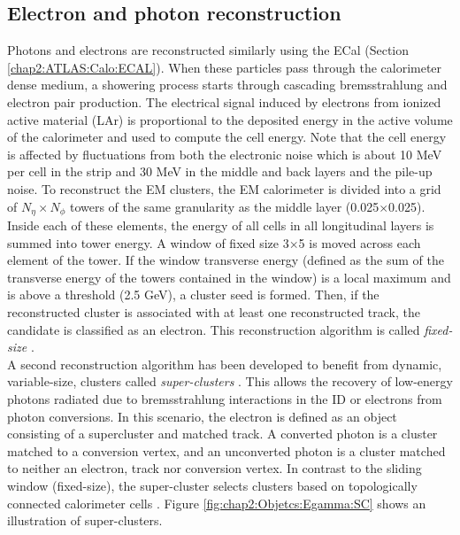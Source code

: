 \subsection{Electron and photon reconstruction}
\label{chap2:Objects:Egamma}
Photons and electrons are reconstructed similarly using the ECal (Section \ref{chap2:ATLAS:Calo:ECAL}). When these particles pass through the calorimeter dense medium, a showering process starts through cascading bremsstrahlung and electron pair production. The electrical signal induced by electrons from ionized active material (LAr) is proportional to the deposited energy in the active volume of the calorimeter and used to compute the cell energy. Note that the cell energy is affected by fluctuations from both the electronic noise which is about 10 MeV per cell in the strip and 30 MeV in the middle and back layers and the pile-up noise. To reconstruct the EM clusters, the EM calorimeter is divided into a grid of $N_\eta\times N_\phi$ towers of the same granularity as the middle layer (0.025$\times$0.025). Inside each of these elements, the energy of all cells in all longitudinal layers is summed into tower energy. A window of fixed size 3$\times$5 is moved across each element of the tower. If the window transverse energy \eT (defined as the sum of the transverse energy of the towers contained in the window) is a local maximum and is above a threshold (2.5 GeV), a cluster seed is formed. Then, if the reconstructed cluster is associated with at least one reconstructed track, the candidate is classified as an electron. This reconstruction algorithm is called \textit{fixed-size} \cite{Fixed_size_cluster}. \\
A second reconstruction algorithm has been developed to benefit from dynamic, variable-size, clusters called \textit{super-clusters} \cite{Egamma_Perf_run2}. This allows the recovery of low-energy photons radiated due to bremsstrahlung interactions in the ID or electrons from photon conversions. In this scenario, the electron is defined as an object consisting of a supercluster and matched track. A converted photon is a cluster matched to a conversion vertex, and an unconverted photon is a cluster matched to neither an electron, track nor conversion vertex. In contrast to the sliding window (fixed-size), the super-cluster selects clusters based on topologically connected calorimeter cells \cite{Topo_cluster}. Figure \ref{fig:chap2:Objetcs:Egamma:SC} shows an illustration of super-clusters.  

